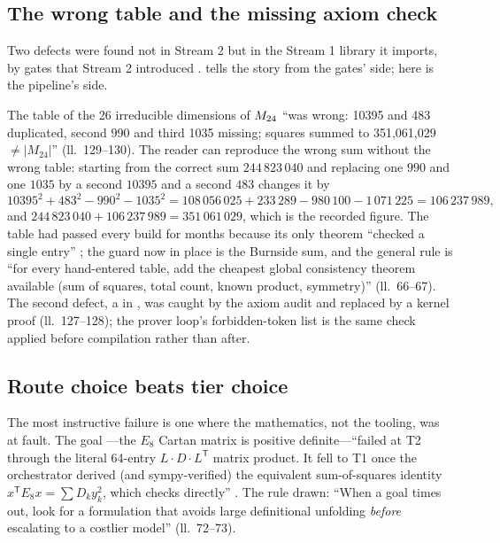 \subsection{The wrong table and the missing axiom check}\label{sec:pipeline:table}

Two defects were found not in Stream 2 but in the Stream 1 library it imports, by gates that
Stream 2 introduced . 
tells the story from the gates' side; here is the pipeline's side.

The table  of the 26 irreducible dimensions of $M_{24}$
``was wrong: 10395 and 483 duplicated, second 990 and third 1035 missing; squares summed
to 351,061,029 $\ne|M_{24}|$'' (ll.~129--130). The reader can reproduce the wrong sum
without the wrong table: starting from the correct sum $244\,823\,040$ and replacing one
$990$ and one $1035$ by a second $10395$ and a second $483$ changes it by
\[
10395^2+483^2-990^2-1035^2 = 108\,056\,025+233\,289-980\,100-1\,071\,225 = 106\,237\,989,
\]
and $244\,823\,040+106\,237\,989=351\,061\,029$, which is the recorded figure. The table
had passed every build for months because its only theorem ``checked a single entry''
; the guard now in place is the Burnside sum, and the
general rule is ``for every hand-entered table, add the cheapest global consistency theorem
available (sum of squares, total count, known product, symmetry)'' (ll.~66--67). The
second defect, a  in , was caught by the
axiom audit and replaced by a kernel  proof (ll.~127--128); the prover loop's
forbidden-token list is the same check applied before compilation rather than after.

\subsection{Route choice beats tier choice}\label{sec:pipeline:route}

The most instructive failure is one where the mathematics, not the tooling, was at fault.
The goal ---the $E_8$ Cartan matrix is positive definite---``failed
at T2 through the literal 64-entry $L\cdot D\cdot L^{\mathsf T}$ matrix product. It fell to
T1 once the orchestrator derived (and sympy-verified) the equivalent sum-of-squares identity
$x^{\mathsf T}E_8x=\sum D_ky_k^2$, which  checks directly''
. The rule drawn: ``When a goal times out, look for a
formulation that avoids large definitional unfolding \emph{before} escalating to a costlier
model'' (ll.~72--73).

